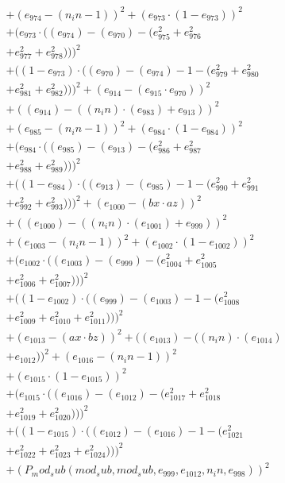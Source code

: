 \documentclass[10pt, a4paper]{article}
\begin{document}
\begin{align*}
& + (e_{974} - (n_in - 1))^{2} + (e_{973}  \cdot  (1 - e_{973}))^{2} \\
& + (e_{973}  \cdot  ((e_{974}) - (e_{970}) - (e_{975}^{2} + e_{976}^{2} \\
& + e_{977}^{2} + e_{978}^{2})))^{2} \\
& + ((1 - e_{973})  \cdot  ((e_{970}) - (e_{974}) - 1 - (e_{979}^{2} + e_{980}^{2} \\
& + e_{981}^{2} + e_{982}^{2})))^{2} + (e_{914} - (e_{915}  \cdot  e_{970}))^{2} \\
& + ((e_{914}) - ((n_in)  \cdot  (e_{983}) + e_{913}))^{2} \\
& + (e_{985} - (n_in - 1))^{2} + (e_{984}  \cdot  (1 - e_{984}))^{2} \\
& + (e_{984}  \cdot  ((e_{985}) - (e_{913}) - (e_{986}^{2} + e_{987}^{2} \\
& + e_{988}^{2} + e_{989}^{2})))^{2} \\
& + ((1 - e_{984})  \cdot  ((e_{913}) - (e_{985}) - 1 - (e_{990}^{2} + e_{991}^{2} \\
& + e_{992}^{2} + e_{993}^{2})))^{2} + (e_{1000} - (bx  \cdot  az))^{2} \\
& + ((e_{1000}) - ((n_in)  \cdot  (e_{1001}) + e_{999}))^{2} \\
& + (e_{1003} - (n_in - 1))^{2} + (e_{1002}  \cdot  (1 - e_{1002}))^{2} \\
& + (e_{1002}  \cdot  ((e_{1003}) - (e_{999}) - (e_{1004}^{2} + e_{1005}^{2} \\
& + e_{1006}^{2} + e_{1007}^{2})))^{2} \\
& + ((1 - e_{1002})  \cdot  ((e_{999}) - (e_{1003}) - 1 - (e_{1008}^{2} \\
& + e_{1009}^{2} + e_{1010}^{2} + e_{1011}^{2})))^{2} \\
& + (e_{1013} - (ax  \cdot  bz))^{2} + ((e_{1013}) - ((n_in)  \cdot  (e_{1014}) \\
& + e_{1012}))^{2} + (e_{1016} - (n_in - 1))^{2} \\
& + (e_{1015}  \cdot  (1 - e_{1015}))^{2} \\
& + (e_{1015}  \cdot  ((e_{1016}) - (e_{1012}) - (e_{1017}^{2} + e_{1018}^{2} \\
& + e_{1019}^{2} + e_{1020}^{2})))^{2} \\
& + ((1 - e_{1015})  \cdot  ((e_{1012}) - (e_{1016}) - 1 - (e_{1021}^{2} \\
& + e_{1022}^{2} + e_{1023}^{2} + e_{1024}^{2})))^{2} \\
& + (P_mod_sub(mod_sub, mod_sub, e_{999}, e_{1012}, n_in, e_{998}))^{2} \\

\end{align*}
\end{document}
